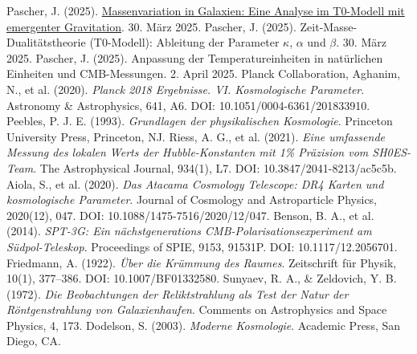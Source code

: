 \documentclass[a4paper,12pt]{article}
\theoremstyle{definition}
\theoremstyle{remark}
\newcommand{\repobase}{https://github.com/jpascher/T0-Time-Mass-Duality/tree/main/2/}
\begin{document}
	\begin{thebibliography}{9}
		 Pascher, J. (2025). \href{\repobase/pdf/Deutsch/Massenvariation in Galaxien - Eine Analyse im T0-Modell mit emergenter Gravitation.pdf}{Massenvariation in Galaxien: Eine Analyse im T0-Modell mit emergenter Gravitation}. 30. März 2025.
		 Pascher, J. (2025). Zeit-Masse-Dualitätstheorie (T0-Modell): Ableitung der Parameter \(\kappa\), \(\alpha\) und \(\beta\). 30. März 2025.
		 Pascher, J. (2025). Anpassung der Temperatureinheiten in natürlichen Einheiten und CMB-Messungen. 2. April 2025.
		Planck Collaboration, Aghanim, N., et al. (2020). 
		\textit{Planck 2018 Ergebnisse. VI. Kosmologische Parameter}. 
		Astronomy \& Astrophysics, 641, A6. 
		DOI: 10.1051/0004-6361/201833910.
		Peebles, P. J. E. (1993). 
		\textit{Grundlagen der physikalischen Kosmologie}. 
		Princeton University Press, Princeton, NJ.
		Riess, A. G., et al. (2021). 
		\textit{Eine umfassende Messung des lokalen Werts der Hubble-Konstanten mit 1\% Präzision vom SH0ES-Team}. 
		The Astrophysical Journal, 934(1), L7. 
		DOI: 10.3847/2041-8213/ac5c5b.
		Aiola, S., et al. (2020). 
		\textit{Das Atacama Cosmology Telescope: DR4 Karten und kosmologische Parameter}. 
		Journal of Cosmology and Astroparticle Physics, 2020(12), 047. 
		DOI: 10.1088/1475-7516/2020/12/047.
		Benson, B. A., et al. (2014). 
		\textit{SPT-3G: Ein nächstgenerations CMB-Polarisationsexperiment am Südpol-Teleskop}. 
		Proceedings of SPIE, 9153, 91531P. 
		DOI: 10.1117/12.2056701.
		Friedmann, A. (1922). 
		\textit{Über die Krümmung des Raumes}. 
		Zeitschrift für Physik, 10(1), 377–386. 
		DOI: 10.1007/BF01332580.
		Sunyaev, R. A., \& Zeldovich, Y. B. (1972). 
		\textit{Die Beobachtungen der Reliktstrahlung als Test der Natur der Röntgenstrahlung von Galaxienhaufen}. 
		Comments on Astrophysics and Space Physics, 4, 173.
		Dodelson, S. (2003). 
		\textit{Moderne Kosmologie}. 
		Academic Press, San Diego, CA.
	\end{thebibliography}
	
\end{document}
